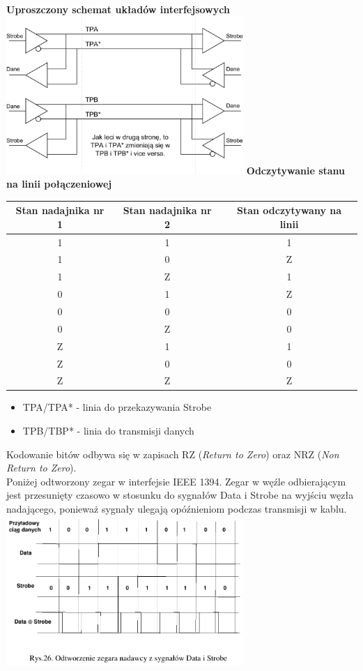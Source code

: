 \textbf{Uproszczony schemat układów interfejsowych}\\
\includegraphics[width=9cm]{./wyklady/Rysunek01.pdf}
\newpage
\textbf{Odczytywanie stanu na linii połączeniowej} \\
\begin{tabular}{|c|c|c|}
	\hline Stan nadajnika nr 1 & Stan nadajnika nr 2 & Stan odczytywany na linii \\ 
	\hline 1 & 1 & 1 \\ 
	\hline 1 & 0 & Z \\ 
	\hline 1 & Z & 1 \\ 
	\hline 0 & 1 & Z \\ 
	\hline 0 & 0 & 0 \\ 
	\hline 0 & Z & 0 \\ 
	\hline Z & 1 & 1 \\ 
	\hline Z & 0 & 0 \\ 
	\hline Z & Z & Z \\ 
	\hline 
\end{tabular} 
\begin{itemize}
	\item TPA/TPA* - linia do przekazywania Strobe
	\item TPB/TBP* - linia do transmisji danych
\end{itemize}
Kodowanie bitów odbywa się w zapisach RZ (\emph{Return to Zero}) oraz NRZ (\emph{Non Return to Zero}).\\
Poniżej odtworzony zegar w interfejsie IEEE 1394. Zegar w węźle odbierającym jest przesunięty czasowo w stosunku do sygnałów Data i Strobe na wyjściu węzła nadającego, ponieważ sygnały ulegają opóźnieniom podczas transmisji w kablu.\\
\includegraphics[width=9cm]{./wyklady/FIREWIRE_28_1.pdf}\\\\
